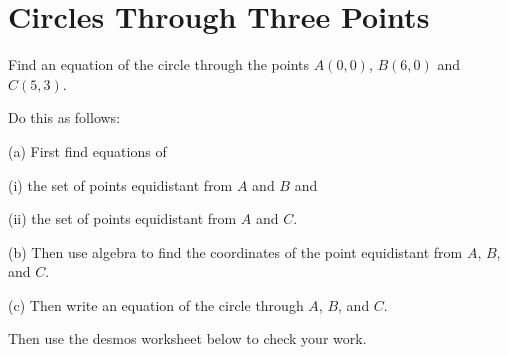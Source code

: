\documentclass{ximera}
\begin{document}
\section*{Circles Through Three Points}

\begin{question}  \label{Q983g4332}
Find an equation of the circle through the points $A(0,0)$, $B(6,0)$ and $C(5,3)$.  

\begin{hint}
Do this as follows:

(a) First find equations of 

(i) the set of points equidistant from $A$ and $B$ and

(ii) the set of points equidistant from $A$ and $C$.

(b) Then use algebra to find the coordinates of the point equidistant from $A$, $B$, and $C$.

(c) Then write an equation of the circle through $A$, $B$, and $C$.

\end{hint}

Then use the desmos worksheet below to check your work.

\begin{onlineOnly}
    \begin{center}
\end{center}
\end{onlineOnly}

\end{question}
\end{document}
